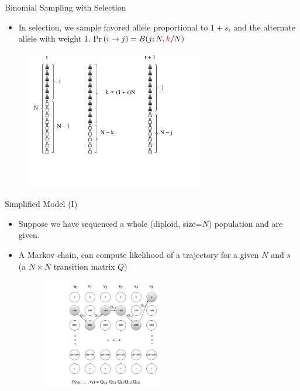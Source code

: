 \documentclass[t]{beamer} %
\begin{document}
\begin{frame}{ Binomial Sampling with Selection}
	\begin{itemize}
		\item 	In selection, we sample favored allele proportional to $1+s$, 
		and the alternate allele  with weight 1.
		Pr$(\textcolor{red}{i}\rightarrow 
		j)=B(j;N,\textcolor{red}{k}/N)$
	\end{itemize}
	
	\begin{figure}
		\includegraphics[trim={.05in 0in 0.0in 
			0.in},clip,width=0.7\textwidth]{../figures/selectiondrift.pdf}
	\end{figure}
\end{frame}

\begin{frame}{ Simplified Model (I)}
	\begin{itemize}
		\item  Suppose we have sequenced a whole (diploid, size=$N$) 
		population   and  are given.
	\pause
		\item A Markov chain, can 
		compute likelihood of a trajectory for a given $N$ and $s$ (a $N \times 
		N $ transition matrix $Q$)
		\begin{figure}
			\includegraphics[trim={.05in 0in 0.0in 
				0.5in},clip,width=0.5\textwidth]{../figures/markoveg.png}
		\end{figure}
	\end{itemize}
\end{frame}
\end{document}
